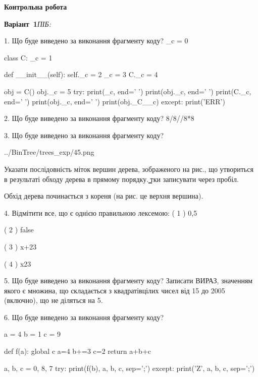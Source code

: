 \documentclass[11pt]{article}
\begin{document}
{\large\textbf{Контрольна робота}}

\textbf{Варіант \No\,1}\hfill \textit{ПІБ:}\,\underline{\hspace{60mm}}
\vspace{4mm}

1. Що буде виведено за виконання фрагменту коду?
_c = 0

class C:
    _c = 1
    
    def __init__(self):
        self._c = 2
        _c = 3
        C._c = 4

obj = C()
obj._c = 5
try:
    print(_c, end=' ')
    print(obj._c, end=' ')
    print(C._c, end=' ')
    print(obj._c, end=' ')
    print(obj._C__c)
except:
    print('ERR')


2. Що буде виведено за виконання фрагменту коду?
8/8//8*8

3. Що буде виведено за виконання фрагменту коду?

\begin{center}
	{../BinTree/trees_exp/45.png}
\end{center}
Указати послідовність міток вершин дерева, зображеного на рис., що утвориться в результаті обходу дерева в прямому порядку. ̳тки записувати через пробіл.\par Обхід дерева починається з кореня (на рис. це верхня вершина).

4. %
Відмітити все, що є однією правильною лексемою:
( 1 ) 0,5

( 2 ) false

( 3 ) x+23

( 4 ) x23


5. Що буде виведено за виконання фрагменту коду?
Записати ВИРАЗ, значенням якого є множина, що складається з квадратівцілих чисел від 15 до 2005 (включно), що не діляться на 5.


6. Що буде виведено за виконання фрагменту коду?

a = 4
b = 1
c = 9

def f(a):
global c    a=4
    b+=3
    c=2
    return a+b+c

a, b, c = 0, 8, 7
try:
    print(f(b), a, b, c, sep=';')
except:
    print('Z', a, b, c, sep=';')
\end{document}
